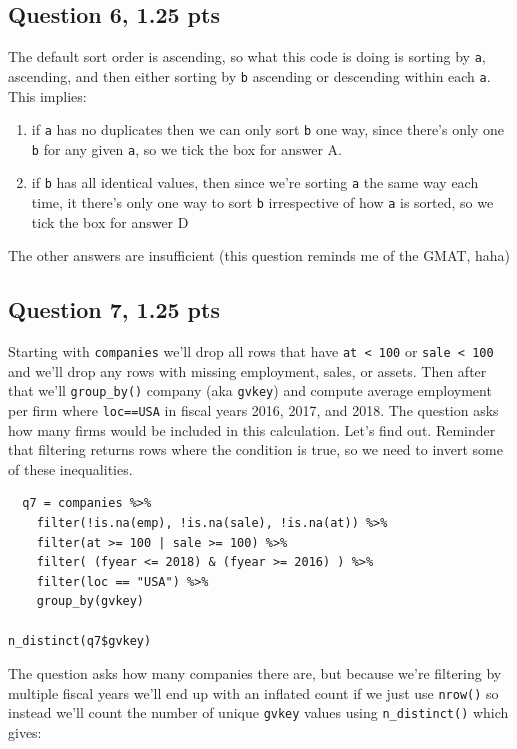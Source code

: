 \documentclass[11pt]{article}
\begin{document}
\subsection*{Question 6, 1.25 pts}
\label{sec:org3b3dca6}
The default sort order is ascending, so what this code is doing is sorting by \texttt{a}, ascending, and then either sorting by \texttt{b} ascending or descending within each \texttt{a}.  This implies:

\begin{enumerate}
\item if \texttt{a} has no duplicates then we can only sort \texttt{b} one way, since there's only one \texttt{b} for any given \texttt{a}, so we tick the box for answer A.
\item if \texttt{b} has all identical values, then since we're sorting \texttt{a} the same way each time, it there's only one way to sort \texttt{b} irrespective of how \texttt{a} is sorted, so we tick the box for answer D
\end{enumerate}


The other answers are insufficient (this question reminds me of the GMAT, haha)

\newpage
\subsection*{Question 7, 1.25 pts}
\label{sec:org7c68d0d}
Starting with \texttt{companies} we'll drop all rows that have \texttt{at < 100} or \texttt{sale < 100} and we'll drop any rows with missing employment, sales, or assets.  Then after that we'll \texttt{group\_by()} company (aka \texttt{gvkey}) and compute average employment per firm where \texttt{loc==USA} in fiscal years 2016, 2017, and 2018.  The question asks how many firms would be included in this calculation.  Let's find out.  Reminder that filtering returns rows where the condition is true, so we need to invert some of these inequalities.

\begin{verbatim}
  q7 = companies %>%
    filter(!is.na(emp), !is.na(sale), !is.na(at)) %>%
    filter(at >= 100 | sale >= 100) %>%
    filter( (fyear <= 2018) & (fyear >= 2016) ) %>%
    filter(loc == "USA") %>%
    group_by(gvkey)

n_distinct(q7$gvkey)
\end{verbatim}

The question asks how many companies there are, but because we're filtering by multiple fiscal years we'll end up with an inflated count if we just use \texttt{nrow()} so instead we'll count the number of unique \texttt{gvkey} values using \texttt{n\_distinct()} which gives:
\end{document}
